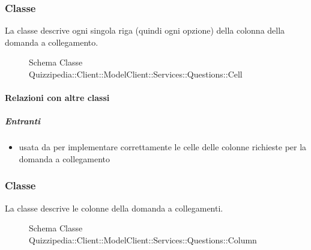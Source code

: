 \subsubsection{Classe }
La classe descrive ogni singola riga (quindi ogni opzione) della colonna della domanda a collegamento.
\begin{figure}[H]
\centering
\noindent{}
\caption[Schema Classe Cell]{Schema Classe Quizzipedia::Client::ModelClient::Services::Questions::Cell}
\end{figure}
\paragraph{Relazioni con altre classi}
\subparagraph{Entranti}
\begin{itemize}
\item usata da  per implementare correttamente le celle delle colonne richieste per la domanda a collegamento
\end{itemize}
\subsubsection{Classe }
La classe descrive le colonne della domanda a collegamenti.
\begin{figure}[H]
\centering
\noindent{}
\caption[Schema Classe Column]{Schema Classe Quizzipedia::Client::ModelClient::Services::Questions::Column}
\end{figure}
